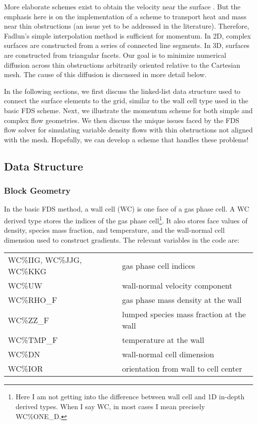 \documentclass[12pt]{article}
\begin{document}
More elaborate schemes exist to obtain the velocity near the surface \cite{Balaras:temp,Choi:temp,McDermott:temp}.  But the emphasis here is on the implementation of a scheme to transport heat and mass near thin obstructions (an issue yet to be addressed in the literature).  Therefore, Fadlun's simple interpolation method is sufficient for momentum.   In 2D, complex surfaces are constructed from a series of connected line segments. In 3D, surfaces are constructed from triangular facets.  Our goal is to minimize numerical diffusion across thin obstructions arbitrarily oriented relative to the Cartesian mesh.  The cause of this diffusion is discussed in more detail below.

In the following sections, we first discuss the linked-list data structure used to connect the surface elements to the grid, similar to the wall cell type used in the basic FDS scheme.  Next, we illustrate the momentum scheme for both simple and complex flow geometries.  We then discuss the unique issues faced by the FDS flow solver for simulating variable density flows with thin obstructions not aligned with the mesh.  Hopefully, we can develop a scheme that handles these problems!

\subsection{Data Structure}

\subsubsection{Block Geometry}

In the basic FDS method, a wall cell (WC) is one face of a gas phase cell.  A WC derived type stores the indices of the gas phase cell\footnote{Here I am not getting into the difference between wall cell and 1D in-depth derived types.  When I say WC, in most cases I mean precisely {\ct WC\%ONE\_D}.}.  It also stores face values of density, species mass fraction, and temperature, and the wall-normal cell dimension used to construct gradients.  The relevant variables in the code are:

\begin{table}[h!]
\begin{tabular}{ll}
{\ct WC\%IIG, WC\%JJG, WC\%KKG} & gas phase cell indices \\
{\ct WC\%UW}                    & wall-normal velocity component \\
{\ct WC\%RHO\_F}                & gas phase mass density at the wall \\
{\ct WC\%ZZ\_F}                 & lumped species mass fraction at the wall \\
{\ct WC\%TMP\_F}                & temperature at the wall \\
{\ct WC\%DN}                    & wall-normal cell dimension \\
{\ct WC\%IOR}                   & orientation from wall to cell center
\end{tabular}
\end{table}
\end{document}
